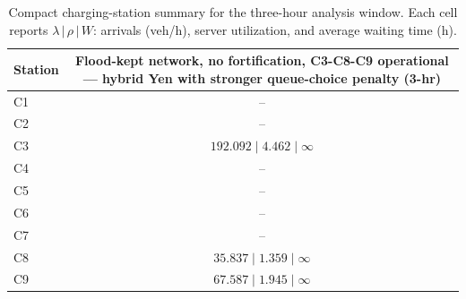 \begin{table}[h!]
\centering
\small
\setlength{\tabcolsep}{4pt}
\renewcommand{\arraystretch}{1.15}
\begin{tabular}{lc}
\toprule
Station & Flood-kept network, no fortification, C3-C8-C9 operational — hybrid Yen with stronger queue-choice penalty (3-hr) \\
\midrule
C1 & -- \\
C2 & -- \\
C3 & $192.092\;|\;4.462\;|\;\infty$ \\
C4 & -- \\
C5 & -- \\
C6 & -- \\
C7 & -- \\
C8 & $35.837\;|\;1.359\;|\;\infty$ \\
C9 & $67.587\;|\;1.945\;|\;\infty$ \\
\bottomrule
\end{tabular}
\caption{Compact charging-station summary for the three-hour analysis window. Each cell reports $\lambda\,|\,\rho\,|\,W$: arrivals (veh/h), server utilization, and average waiting time (h).}
\label{tab:chicago_flood_kept_no_fortification_c3_c8_c9_hybrid_tree_yen_stronger_queue_penalty_station_compact}
\end{table}
